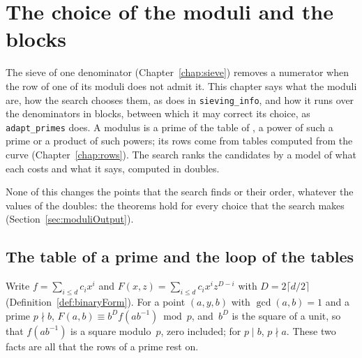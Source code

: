\chapter{The choice of the moduli and the blocks}\label{chap:moduli}

The sieve of one denominator (Chapter~\ref{chap:sieve}) removes a numerator when the row of one of
its moduli does not admit it. This chapter says what the moduli are, how the search chooses them, as
\ratpoints{} does in \verb|sieving_info|, and how it runs over the denominators in blocks, between
which it may correct its choice, as \verb|adapt_primes| does. A modulus is a prime of the table of
\ratpoints{}, a power of such a prime or a product of such powers; its rows come from tables computed
from the curve (Chapter~\ref{chap:rows}). The search ranks the candidates by a model of what each
costs and what it says, computed in doubles.

None of this changes the points that the search finds or their order, whatever the values of the
doubles: the theorems hold for every choice that the search makes (Section~\ref{sec:moduliOutput}).

\section{The table of a prime and the loop of the tables}\label{sec:moduliPrimeTable}

Write $f = \sum_{i \le d} c_i x^i$ and $F(x, z) = \sum_{i \le d} c_i x^i z^{D - i}$ with
$D = 2 \lceil d/2 \rceil$ (Definition~\ref{def:binaryForm}). For a point $(a, y, b)$ with
$\gcd(a, b) = 1$ and a prime $p \nmid b$, $F(a, b) \equiv b^D f(a b^{-1}) \bmod p$, and~$b^D$ is the
square of a unit, so that $f(a b^{-1})$ is a square modulo~$p$, zero included; for $p \mid b$,
$p \nmid a$. These two facts are all that the rows of a prime rest on.

